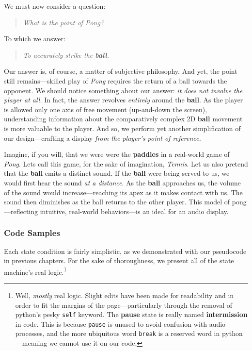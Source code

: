 \documentclass{report}
\newcommand{\state}[1]{\textbf{#1}}
\newcommand{\ball}{\textbf{ball}\xspace}
\begin{document}
We must now consider a question: 
\begin{quote}
\emph{What is the point of Pong?}     
\end{quote}

To which we answer:
\begin{quote}
\emph{To accurately strike the \ball.}
\end{quote}

Our answer is, of course, a matter of subjective philosophy. And yet, the point still remains---skilled play of \emph{Pong} requires the return of a ball towards the opponent. We should notice something about our answer: \emph{it does not involve the player at all.} In fact, the answer revolves \emph{entirely} around the \ball. As the player is allowed only one axis of free movement (up-and-down the screen), understanding information about the comparatively complex 2D \ball movement is more valuable to the player. And so, we perform yet another simplification of our design---crafting a display \emph{from the player's point of reference.} 

Imagine, if you will, that we were were the \state{paddles} in a real-world game of \emph{Pong}. Lets call this game, for the sake of imagination, \emph{Tennis}. Let us also pretend that the \ball emits a distinct sound. If the \ball were being served to us, we would first hear the sound \emph{at a distance}. As the \ball approaches us, the volume of the sound would increase---reaching its apex as it makes contact with us. The sound then diminishes as the ball returns to the other player. This model of pong---reflecting intuitive, real-world behaviors---is an ideal for an audio display.


\subsubsection{Code Samples}
Each state condition is fairly simplistic, as we demonstrated with our pseudocode in previous chapters. For the sake of thoroughness, we present all of the state machine's real logic.\footnote{Well, \emph{mostly} real logic. Slight edits have been made for readability and in order to fit the margins of the page---particularly through the removal of python's pesky \texttt{self} keyword. The \state{pause} state is really named \state{intermission} in code. This is because \texttt{pause} is unused to avoid confusion with audio processes, and the more ubiquitous word \texttt{break} is a reserved word in python---meaning we cannot use it on our code.}
\end{document}

